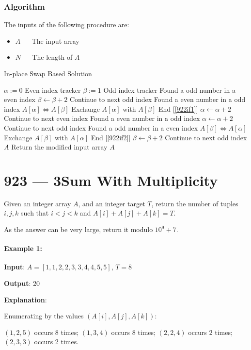 \subsubsection{Algorithm}
The inputs of the following procedure are:
\begin{itemize}
    \item $A$ --- The input array
    \item $N$ --- The length of $A$
\end{itemize}
\setcounter{algorithm}{0}
\begin{algorithm}[H]
\caption{In-place Swap Based Solution}
\begin{algorithmic}[1]
\State $\alpha := 0$ \Comment Even index tracker
\State $\beta := 1$ \Comment Odd index tracker
 \Comment Found a odd number in a even index \label{922if1}
\State $\beta \gets \beta + 2$ \Comment Continue to next odd index
\EndWhile
{} \Comment Found a even number in a odd index
\State $A[\alpha] \Longleftrightarrow A[\beta]$ \Comment Exchange $A[\alpha]$ with $A[\beta]$
\EndIf
\EndIf \Comment End [\ref{922if1}]
\State $\alpha \gets \alpha + 2 $ \Comment Continue to next even index
 \Comment Found a even number in a odd index \label{922if2}
\State $\alpha \gets \alpha + 2$ \Comment Continue to next odd index
\EndWhile
{} \Comment Found a odd number in a even index
\State $A[\beta] \Longleftrightarrow A[\alpha]$ \Comment Exchange $A[\beta]$ with $A[\alpha]$
\EndIf
\EndIf \Comment End [\ref{922if2}]
\State $\beta \gets \beta + 2 $ \Comment Continue to next odd index
\EndWhile
\State \Return $A$ \Comment Return the modified input array $A$
\EndProcedure
\end{algorithmic}
\end{algorithm}

\section{923 --- 3Sum With Multiplicity}
Given an integer array $A$, and an integer target $T$, return the number of tuples $i, j, k$  such that $i < j < k$ and $A[i] + A[j] + A[k] = T$.
\par
As the answer can be very large, return it modulo $10^9 + 7$.
\paragraph{Example 1:}
\begin{flushleft}
\textbf{Input}: $A = [1,1,2,2,3,3,4,4,5,5]$, $T = 8$
\par
\textbf{Output}: 20
\par
\textbf{Explanation}:
\par
Enumerating by the values $(A[i], A[j], A[k])$:
\par
$(1, 2, 5)$ occurs 8 times;
$(1, 3, 4)$ occurs 8 times;
$(2, 2, 4)$ occurs 2 times;
$(2, 3, 3)$ occurs 2 times.
\end{flushleft}
